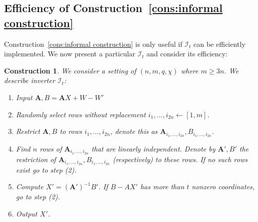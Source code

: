 \documentclass[11pt]{article}
\newcommand{\consref}[1]{\mbox{Construction~\ref{#1}}}
\newcommand{\class}[1]{{\ensuremath{\mathsf{#1}}}}
\newcommand{\gen}{\ensuremath{\class{Gen}}\xspace}
\newcommand{\rep}{\ensuremath{\class{Rep}}\xspace}
\newcommand{\vect}[1]{\ensuremath{\textbf{#1}}}
\newcommand{\Fq}{\ensuremath{\mathbb{F}_q}}
\newcommand{\sample}{\ensuremath{\class{Sample}}\xspace}
\newtheorem{construction}[theorem]{Construction}
\newcommand{\vA}{\vect{A}}
\begin{document}

\subsection{Efficiency of \consref{cons:informal construction}}
\label{sec:time main construction}
\consref{cons:informal construction} is only useful if $\mathcal{I}_t$ can be efficiently implemented.  We now present a particular $\mathcal{I}_t$ and consider its efficiency:

\begin{construction}
\label{cons:decoding algorithm} We consider a setting of $(n, m, q, \chi)$ where $m\geq 3n$.  We describe inverter $\mathcal{I}_t$:
\begin{enumerate}
\item Input $\vA , B = \vA X + W - W'$
\item Randomly select rows without replacement $i_1,..., i_{2n}\leftarrow [1,m]$.  
\item Restrict $\vA, B$ to rows $i_1,...,i_{2n}$, denote this as $\vA_{i_1,...,i_{2n}}, B_{i_1,...,i_{2n}}$.
\item Find $n$ rows of $\vA_{i_1,..., i_{2n}}$ that are linearly independent.  
Denote by $\vA', B'$ the restriction of $\vA_{i_1,..., i_{2n}}, B_{i_1,..., i_{2n}}$ (respectively) to these rows.  If no such rows exist go to step (2).
\item Compute $X' = (\vA')^{-1}B'$.  If $B- AX'$ has more than $t$ nonzero coordinates, go to step (2).
\item Output $X'$.
\end{enumerate}
\end{construction}
\end{document}
